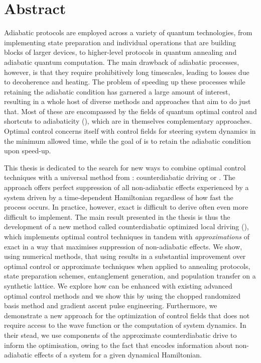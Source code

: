 \chapter{Abstract}\label{chap:abstract}

Adiabatic protocols are employed across a variety of quantum technologies, from implementing state preparation and individual operations that are building blocks of larger devices, to higher-level protocols in quantum annealing and adiabatic quantum computation. The main drawback of adiabatic processes, however, is that they require prohibitively long timescales, leading to losses due to decoherence and heating. The problem of speeding up these processes while retaining the adiabatic condition has garnered a large amount of interest, resulting in a whole host of diverse methods and approaches that aim to do just that. Most of these are encompassed by the fields of quantum optimal control and shortcuts to adiabaticity (), which are in themselves complementary approaches. Optimal control concerns itself with control fields for steering system dynamics in the minimum allowed time, while the goal of  is to retain the adiabatic condition upon speed-up.

This thesis is dedicated to the search for new ways to combine optimal control techniques with a universal method from : counterdiabatic driving or . The  approach offers perfect suppression of all non-adiabatic effects experienced by a system driven by a time-dependent Hamiltonian regardless of how fast the process occurs. In practice, however, exact  is difficult to derive often even more difficult to implement. The main result presented in the thesis is thus the development of a new method called counterdiabatic optimized local driving (), which implements optimal control techniques in tandem with \emph{approximations} of exact  in a way that maximises suppression of non-adiabatic effects. We show, using numerical methods, that using  results in a substantial improvement over optimal control or approximate  techniques when applied to annealing protocols, state preparation schemes, entanglement generation, and population transfer on a synthetic lattice. We explore how  can be enhanced with existing advanced optimal control methods and we show this by using the chopped randomized basis method and gradient ascent pulse engineering. Furthermore, we demonstrate a new approach for the optimization of control fields that does not require access to the wave function or the computation of system dynamics. In their stead, we use components of the approximate counterdiabatic drive to inform the optimisation, owing to the fact that  encodes information about non-adiabatic effects of a system for a given dynamical Hamiltonian. 